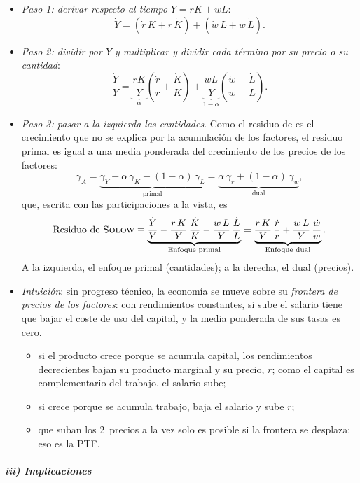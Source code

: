 \documentclass[11pt]{article}
\begin{document}
\begin{itemize}
\item \emph{Paso 1: derivar respecto al tiempo} $Y=rK+wL$:
  \[
  \dot Y=\left(\dot r\,K+r\,\dot K\right)+\left(\dot w\,L+w\,\dot L\right).
  \]
\item \emph{Paso 2: dividir por $Y$ y multiplicar y dividir cada término por su precio o su cantidad}:
  \[
  \frac{\dot Y}{Y}=\underbrace{\frac{rK}{Y}}_{\alpha}\left(\frac{\dot r}{r}+\frac{\dot K}{K}\right)+\underbrace{\frac{wL}{Y}}_{1-\alpha}\left(\frac{\dot w}{w}+\frac{\dot L}{L}\right).
  \]
\item \emph{Paso 3: pasar a la izquierda las cantidades}. Como el residuo de  es el crecimiento que no se explica por la acumulación de los factores, el residuo primal es igual a una media ponderada del crecimiento de los precios de los factores:
  \begin{equation}
  \gamma_A=\underbrace{\gamma_Y-\alpha\,\gamma_K-(1-\alpha)\,\gamma_L}_{\text{primal}}=\underbrace{\alpha\,\gamma_r+(1-\alpha)\,\gamma_w}_{\text{dual}},\label{eq:dual}
  \end{equation}
  que, escrita con las participaciones a la vista, es
  \[
  \text{Residuo de \textsc{Solow}}\equiv\underbrace{\frac{\dot Y}{Y}-\frac{r\,K}{Y}\,\frac{\dot K}{K}-\frac{w\,L}{Y}\,\frac{\dot L}{L}}_{\text{Enfoque primal}}=\underbrace{\frac{r\,K}{Y}\,\frac{\dot r}{r}+\frac{w\,L}{Y}\,\frac{\dot w}{w}}_{\text{Enfoque dual}} .
  \]
  A la izquierda, el enfoque primal (cantidades); a la derecha, el dual (precios).
\item \emph{Intuición}: sin progreso técnico, la economía se mueve sobre su \emph{frontera de precios de los factores}: con rendimientos constantes, si sube el salario tiene que bajar el coste de uso del capital, y la media ponderada de sus tasas es cero.
  \begin{itemize}
  \item si el producto crece porque se acumula capital, los rendimientos decrecientes bajan su producto marginal y su precio, $r$; como el capital es complementario del trabajo, el salario sube;
  \item si crece porque se acumula trabajo, baja el salario y sube $r$;
  \item que suban los 2~precios a la vez solo es posible si la frontera se desplaza: eso es la PTF.
  \end{itemize}
\end{itemize}

\subparagraph{iii) Implicaciones}
\end{document}
